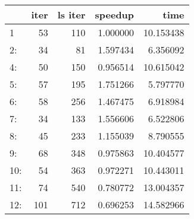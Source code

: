\begin{tabular}{lrrrr}
\toprule
{} &  iter &  ls iter &   speedup &       time \\
\midrule
1   &    53 &      110 &  1.000000 &  10.153438 \\
2:  &    34 &       81 &  1.597434 &   6.356092 \\
4:  &    50 &      150 &  0.956514 &  10.615042 \\
5:  &    57 &      195 &  1.751266 &   5.797770 \\
6:  &    58 &      256 &  1.467475 &   6.918984 \\
7:  &    34 &      133 &  1.556606 &   6.522806 \\
8:  &    45 &      233 &  1.155039 &   8.790555 \\
9:  &    68 &      348 &  0.975863 &  10.404577 \\
10: &    54 &      363 &  0.972271 &  10.443011 \\
11: &    74 &      540 &  0.780772 &  13.004357 \\
12: &   101 &      712 &  0.696253 &  14.582966 \\
\bottomrule
\end{tabular}
